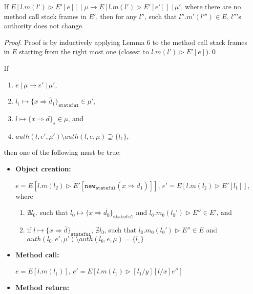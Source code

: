 \documentclass{llncs}
\newcommand{\keywadj}[1]{\mathtt{#1}}
\begin{document}
\begin{lemma} If 
\mbox{$E[l.m(l') \rhd E'[e]]~|~\mu \longrightarrow E[l.m(l') \rhd E'[e']]~|~\mu'$}, where there are no method call stack frames in $E'$, then for any $l''$, such that $l''.m'(l''') \in E$, $l''$'s authority does not change.
\end{lemma}

\begin{proof}
Proof is by inductively applying Lemma 6 to the method call stack frames in $E$ starting from the right most one (closest to $l.m(l') \rhd E'[e]$).\qed
\end{proof}


\newpage

\begin{theorem} If
\begin{enumerate}
\item $e~|~\mu \longrightarrow e'~|~\mu'$,
\item $l_1 \mapsto \{ x \Rightarrow \overline{d}_1 \}_{\keywadj{stateful}} \in \mu'$,
\item $l \mapsto \{ x \Rightarrow \overline{d} \}_s \in \mu$, and
\item $auth(l, e', \mu') \setminus auth(l, e, \mu) \supseteq \{ l_1 \}$,
\end{enumerate}
then one of the following must be true:
\begin{itemize}
\item \textbf{Object creation:}

$e = E[l.m(l_2) \rhd E'[\keywadj{new}_{\keywadj{stateful}}(x \Rightarrow \overline{d}_1)]]$, $e' = E[l.m(l_2) \rhd E'[l_1]]$, where
\begin{enumerate}
\item $\nexists l_0$, such that $l_0 \mapsto \{ x \Rightarrow \overline{d_0}\}_{\keywadj{stateful}}$ and $l_0.m_0(l_0') \rhd E'' \in E'$, and
\item if $l \mapsto \{ x \Rightarrow \overline{d}\}_{\keywadj{stateful}}$, $\nexists l_0$, such that $l_0.m_0(l_0') \rhd E'' \in E$ and $auth(l_0, e', \mu') \setminus auth(l_0, e, \mu) = \{ l_1 \}$
\end{enumerate}

\item \textbf{Method call:}

$e = E[l.m(l_1)]$, $e' = E[l.m(l_1) \rhd [l_1/y][l/x]e'']$

\item \textbf{Method return:}


\end{itemize}
\end{theorem}
\end{document}
